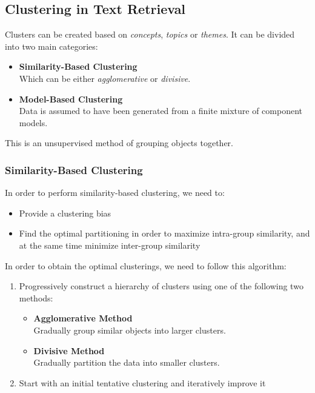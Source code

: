 \documentclass{article}
\begin{document}
\subsection{Clustering in Text Retrieval}
Clusters can be created based on \textit{concepts}, \textit{topics} or \textit{themes}. It can be divided into two main categories:

\begin{itemize}
	\item \textbf{Similarity-Based Clustering}
	\vspace{.2cm} \\
	Which can be either \textit{agglomerative} or \textit{divisive}.
	
	\item \textbf{Model-Based Clustering}
	\vspace{.2cm} \\
	Data is assumed to have been generated from a finite mixture of component models.
\end{itemize}
This is an unsupervised method of grouping objects together.

\subsubsection{Similarity-Based Clustering}
In order to perform similarity-based clustering, we need to:

\begin{itemize}
	\item Provide a clustering bias
	\item Find the optimal partitioning in order to maximize intra-group similarity, and at the same time minimize inter-group similarity
\end{itemize}
In order to obtain the optimal clusterings, we need to follow this algorithm:

\begin{enumerate}
	\item Progressively construct a hierarchy of clusters using one of the following two methods:
	
	\begin{itemize}
		\item \textbf{Agglomerative Method}
		\vspace{.2cm} \\
		Gradually group similar objects into larger clusters.
			
		\item \textbf{Divisive Method}
		\vspace{.2cm} \\
		Gradually partition the data into smaller clusters.
	\end{itemize}
	
	\item Start with an initial tentative clustering and iteratively improve it
\end{enumerate}
\end{document}

